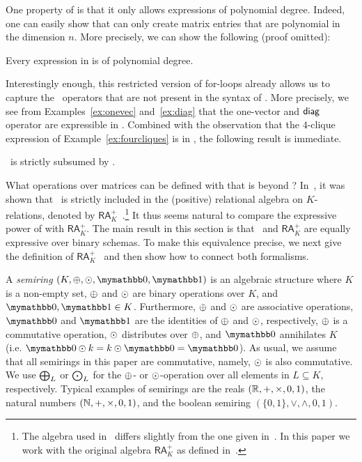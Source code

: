 One property of \langsum is that it only allows expressions of polynomial degree. Indeed, one can easily show that \langsum can only create matrix entries that are polynomial in the dimension $n$. More precisely, we can show the following (proof omitted):
\begin{proposition}\label{prop:poly}
Every expression in \langsum is of polynomial degree.
\end{proposition}

Interestingly enough, this restricted version of for-loops already allows us to capture the \lang\ operators that are not present in the syntax of \langsum. More precisely, we see from Examples~\ref{ex:onevec} and~\ref{ex:diag} that the one-vector and $\textsf{diag}$ operator are expressible in \langsum. Combined with the observation that the $4$-clique
expression of Example~\ref{ex:fourcliques} is in \langsum, the following result is immediate.

\begin{corollary}
\lang\ is strictly subsumed by \langsum.
\end{corollary}

What operations over matrices can be defined with \langsum that is beyond \lang? In~\cite{brijder2019matrices}, it was shown that \lang\ is strictly included in the (positive) relational algebra on $K$-relations, denoted by $\mathsf{RA}_{K}^+$~\cite{GreenKT07}.\footnote{The algebra used in~\cite{brijder2019matrices} differs slightly from the one given in~\cite{GreenKT07}. In this paper we work with the original algebra $\mathsf{RA}_{K}^+$ as defined in~\cite{GreenKT07}.} 
It thus seems natural to compare the expressive power of \langsum with $\mathsf{RA}_{K}^+$. 
The main result in this section is that \langsum\ and $\mathsf{RA}_{K}^+$ 
are equally expressive over binary schemas. 
To make this equivalence precise, we next give the 
definition of $\mathsf{RA}_{K}^+$~\cite{GreenKT07} and then show how to connect both formalisms.

A \textit{semiring} $(K, \ksum, \kprod, \kzero, \kone)$ is an algebraic structure where $K$ is a non-empty set, $\oplus$ and $\odot$ are binary operations over $K$, and $\kzero, \kone \in K$. Furthermore,  $\oplus$ and $\odot$ are associative operations, $\kzero$ and $\kone$ are the identities of $\oplus$ and $\odot$, respectively, $\oplus$ is a commutative operation, $\odot$ distributes over $\oplus$, and $\kzero$ annihilates $K$ (i.e. $\kzero \kprod k = k \kprod \kzero = \kzero$). As usual, we assume that all semirings in this paper are commutative, namely, $\odot$ is also commutative. We use $\bigoplus_L$ or $\bigodot_L$ for the $\oplus$- or $\odot$-operation over all elements in $L\subseteq K$, respectively. Typical examples of semirings are the reals $(\mathbb{R}, +, \times, 0,1)$, the natural numbers $(\mathbb{N}, +, \times, 0,1)$, and the boolean semiring $(\{0,1\}, \vee, \wedge, 0, 1)$. 

